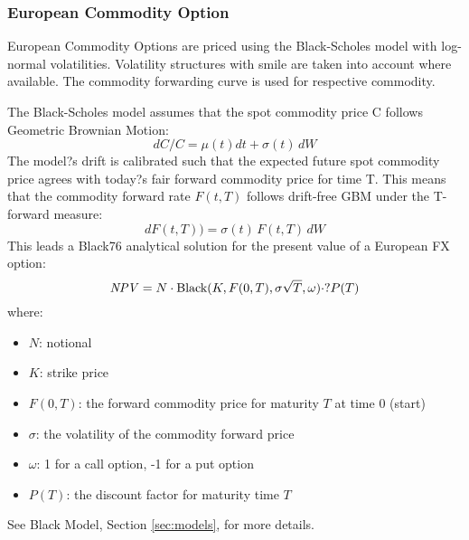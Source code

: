\subsubsection{European Commodity Option}
\label{pricing:com_option}

European Commodity Options are priced using the Black-Scholes model with log-normal 
volatilities. Volatility structures with smile are taken into account where available. 
The commodity forwarding curve is used for respective commodity.

The Black-Scholes model assumes that the spot commodity price C follows Geometric 
Brownian Motion:
$$
dC/C=\mu(t)dt + \sigma(t)\,dW
$$
The model?s drift is calibrated such that the expected future spot commodity price 
agrees with today?s fair forward commodity price for time T. This means that the 
commodity forward rate $F(t,T)$ follows drift-free GBM under the T-forward measure:
$$
dF(t,T)) = \sigma(t)\,F(t,T)\,dW
$$
This leads a Black76 analytical solution for the present value of a European FX option:
$$
\mathit{NPV} = N\cdot \mbox{Black}(K, F(0,T), \sigma\sqrt{T},\omega)\cdot?P(T)
$$
where:
\begin{itemize}
\item $N$: notional
\item $K$: strike price
\item $F(0,T)$: the forward commodity price for maturity $T$ at time 0 (start)
\item $\sigma$: the volatility of the commodity forward price
\item $\omega$: 1 for a call option, -1 for a put option
\item $P(T)$: the discount factor for maturity time $T$
\end{itemize}

See Black Model, Section \ref{sec:models}, for more details.

